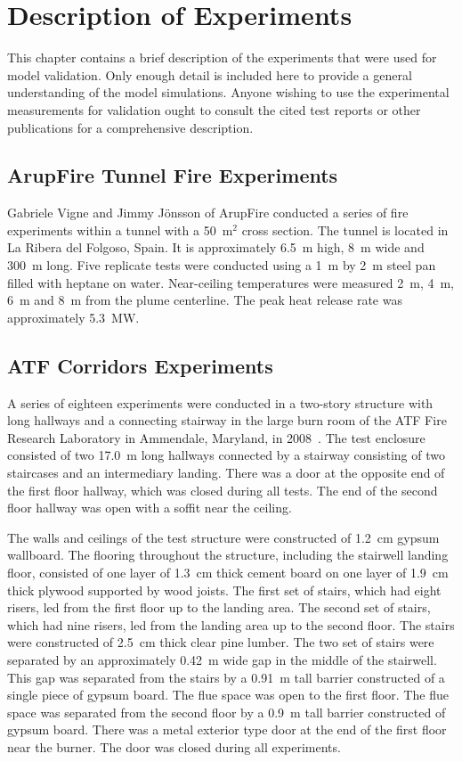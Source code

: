 \chapter{Description of Experiments}

\label{Experiments_Chapter}

This chapter contains a brief description of the experiments that were used for model validation. Only enough detail is included here to provide a
general understanding of the model simulations. Anyone wishing to use the experimental measurements for validation ought to consult the cited test reports
or other publications for a comprehensive description.


\section{ArupFire Tunnel Fire Experiments}

Gabriele Vigne and Jimmy J\"{o}nsson of ArupFire conducted a series of fire experiments within a tunnel with a 50~m$^2$ cross section. The tunnel is located
in La Ribera del Folgoso, Spain. It is approximately 6.5~m high, 8~m wide and 300~m long.
Five replicate tests were conducted using a 1~m by 2~m steel pan filled with heptane on water. Near-ceiling temperatures
were measured 2~m, 4~m, 6~m and 8~m from the plume centerline. The peak heat release rate was approximately 5.3~MW.


\section{ATF Corridors Experiments}

A series of eighteen experiments were conducted in a two-story structure with long hallways and a connecting stairway
in the large burn room of the ATF Fire Research Laboratory in Ammendale, Maryland, in 2008~\cite{Sheppard:Corridors}.
The test enclosure consisted of two 17.0~m long hallways connected by a
stairway consisting of two staircases and an intermediary landing.
There was a door at the opposite end of the first floor hallway, which was closed during all tests.
The end of the second floor hallway was open with a soffit near the ceiling.

The walls and ceilings of the test structure were constructed of 1.2~cm gypsum wallboard.
The flooring throughout the structure, including the stairwell landing floor, consisted of one layer of 1.3~cm thick cement board on one
layer of 1.9~cm thick plywood supported by wood joists. The first set of stairs, which had eight risers, led from the first floor up to the landing area.
The second set of stairs, which had nine risers, led from the landing area up to the second floor.
The stairs were constructed of 2.5~cm thick clear pine lumber. The two set of stairs were separated by an approximately 0.42~m wide gap in the middle of the stairwell.
This gap was separated from the stairs by a 0.91~m tall barrier constructed of a single piece of gypsum board.
The flue space was open to the first floor.  The flue space was separated from the second floor by a 0.9~m tall barrier constructed of gypsum board.
There was a metal exterior type door at the end of the first floor near the burner.  The door was closed during all experiments.

